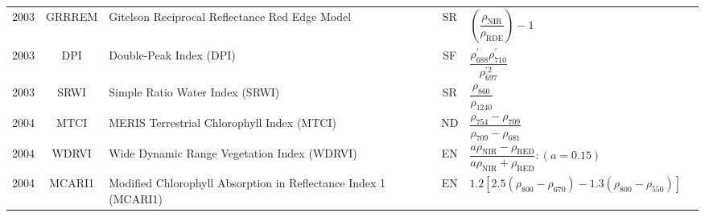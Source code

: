 \documentclass[10pt]{article}
\begin{document}
\begin{ThreePartTable}
\begin{longtable}{c c m{2.3in} c M{2.8in} M{1.5in}}
  2003 & GRRREM  & Gitelson Reciprocal Reflectance Red Edge Model                                 & SR & $\left(\dfrac{\rho_\text{NIR}}{\rho_\text{RDE}}\right)-1$                                                                                                                                                                                                                               & \citet{Gitelson2003,Gitelson2005}                   \\
  2003 & DPI     & Double-Peak Index (DPI)                                                        & SF & $\dfrac{\rho^\prime_{688}\rho^\prime_{710}}{\rho^{\prime2}_{697}}$                                                                                                                                                                                                                      & \citet{Zarco-Tejada2003}                            \\
  2003 & SRWI    & Simple Ratio Water Index (SRWI)                                                & SR & $\dfrac{\rho_{860}}{\rho_{1240}}$                                                                                                                                                                                                                                                       & \citet{Zarco-Tejada2003b}                           \\
  2004 & MTCI    & MERIS Terrestrial Chlorophyll Index (MTCI)                                     & ND & $\dfrac{\rho_{754}-\rho_{709}}{\rho_{709}-\rho_{681}}$                                                                                                                                                                                                                                  & \citet{Dash2004}                                    \\
  2004 & WDRVI   & Wide Dynamic Range Vegetation Index (WDRVI)                                    & EN & $\dfrac{a\rho_\text{NIR}-\rho_\text{RED}}{a\rho_\text{NIR}+\rho_\text{RED}} : (a=0.15)$                                                                                                                                                                                                 & \citet{Gitelson2004}                                \\
  2004 & MCARI1  & Modified Chlorophyll Absorption in Reflectance Index 1 (MCARI1)                & EN & $1.2[2.5(\rho_{800}-\rho_{670})-1.3(\rho_{800}-\rho_{550})]$                                                                                                                                                                                                                            & \citet{Haboudane2004}                               \\

\end{longtable}
\end{ThreePartTable}
\end{document}
